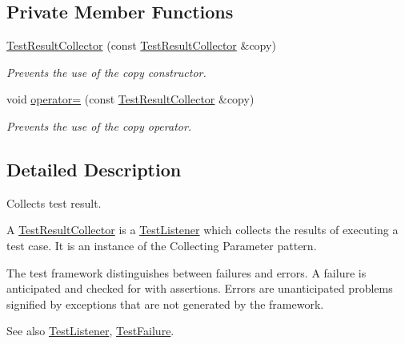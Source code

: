 \subsection*{Private Member Functions}
\begin{DoxyCompactItemize}
\item 
\hyperlink{class_test_result_collector_a849d11b2d2467f6839bbb3d45bc3db58}{Test\+Result\+Collector} (const \hyperlink{class_test_result_collector}{Test\+Result\+Collector} \&copy)\hypertarget{class_test_result_collector_a849d11b2d2467f6839bbb3d45bc3db58}{}\label{class_test_result_collector_a849d11b2d2467f6839bbb3d45bc3db58}

\begin{DoxyCompactList}\small\item\em Prevents the use of the copy constructor. \end{DoxyCompactList}\item 
void \hyperlink{class_test_result_collector_a66e7cda3c1ec570f6e390f9a91605d45}{operator=} (const \hyperlink{class_test_result_collector}{Test\+Result\+Collector} \&copy)\hypertarget{class_test_result_collector_a66e7cda3c1ec570f6e390f9a91605d45}{}\label{class_test_result_collector_a66e7cda3c1ec570f6e390f9a91605d45}

\begin{DoxyCompactList}\small\item\em Prevents the use of the copy operator. \end{DoxyCompactList}\end{DoxyCompactItemize}


\subsection{Detailed Description}
Collects test result.

A \hyperlink{class_test_result_collector}{Test\+Result\+Collector} is a \hyperlink{class_test_listener}{Test\+Listener} which collects the results of executing a test case. It is an instance of the Collecting Parameter pattern. 

The test framework distinguishes between failures and errors. A failure is anticipated and checked for with assertions. Errors are unanticipated problems signified by exceptions that are not generated by the framework. \begin{DoxySeeAlso}{See also}
\hyperlink{class_test_listener}{Test\+Listener}, \hyperlink{class_test_failure}{Test\+Failure}. 
\end{DoxySeeAlso}


